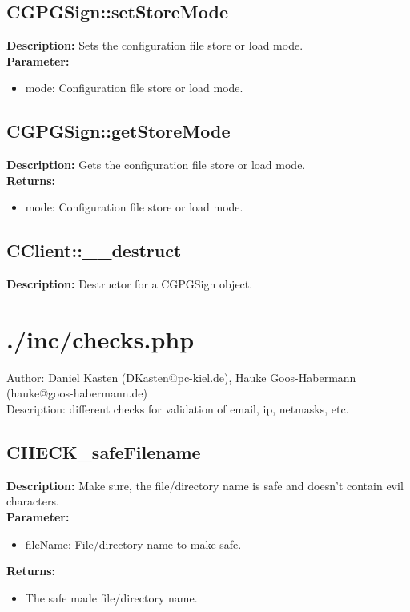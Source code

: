 \subsection{CGPGSign::setStoreMode}
\textbf{Description:} Sets the configuration file store or load mode.\\
\textbf{Parameter:}
\begin{itemize}
\item mode: Configuration file store or load mode.
\end{itemize}

\subsection{CGPGSign::getStoreMode}
\textbf{Description:} Gets the configuration file store or load mode.\\
\textbf{Returns:}
\begin{itemize}
\item mode: Configuration file store or load mode.
\end{itemize}

\subsection{CClient::\_\_destruct}
\textbf{Description:} Destructor for a CGPGSign object.\\

\newpage\section{./inc/checks.php}
 Author: Daniel Kasten (DKasten@pc-kiel.de), Hauke Goos-Habermann (hauke@goos-habermann.de)\\
 Description: different checks for validation of email, ip, netmasks, etc.\\

\subsection{CHECK\_safeFilename}
\textbf{Description:} Make sure, the file/directory name is safe and doesn't contain evil characters.\\
\textbf{Parameter:}
\begin{itemize}
\item fileName: File/directory name to make safe.
\end{itemize}
\textbf{Returns:}
\begin{itemize}
\item The safe made file/directory name.
\end{itemize}

